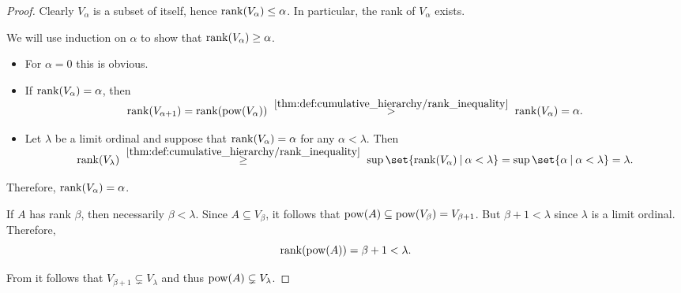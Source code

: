 \begin{proof}
   Clearly \( V_\alpha \) is a subset of itself, hence \( \operatorname{rank}(V_\alpha) \leq \alpha \). In particular, the rank of \( V_\alpha \) exists.

  We will use induction on \( \alpha \) to show that \( \operatorname{rank}(V_\alpha) \geq \alpha \).
  \begin{itemize}
    \item For \( \alpha = 0 \) this is obvious.
    \item If \( \operatorname{rank}(V_\alpha) = \alpha \), then
    \begin{equation*}
      \rank(V_{\alpha + 1})
      =
      \rank(\pow(V_\alpha))
      \reloset {\ref{thm:def:cumulative_hierarchy/rank_inequality}} >
      \rank(V_\alpha)
      =
      \alpha.
    \end{equation*}

    \item Let \( \lambda \) be a limit ordinal and suppose that \( \operatorname{rank}(V_\alpha) = \alpha \) for any \( \alpha < \lambda \). Then
    \begin{equation*}
      \rank(V_\lambda)
      \reloset {\ref{thm:def:cumulative_hierarchy/rank_inequality}} \geq
      \sup\set{ \rank(V_\alpha) \given \alpha < \lambda }
      =
      \sup\set{ \alpha \given \alpha < \lambda }
      =
      \lambda.
    \end{equation*}
  \end{itemize}

  Therefore, \( \operatorname{rank}(V_\alpha) = \alpha \).

   If \( A \) has rank \( \beta \), then necessarily \( \beta < \lambda \). Since \( A \subseteq V_\beta \), it follows that \( \operatorname{pow}(A) \subseteq \operatorname{pow}(V_\beta) = V_{\beta + 1} \). But \( \beta + 1 < \lambda \) since \( \lambda \) is a limit ordinal. Therefore,
  \begin{equation*}
    \operatorname{rank}(\operatorname{pow}(A)) = \beta + 1 < \lambda.
  \end{equation*}

  From  it follows that \( V_{\beta + 1} \subsetneq V_\lambda \) and thus \( \operatorname{pow}(A) \subsetneq V_\lambda \).
\end{proof}

